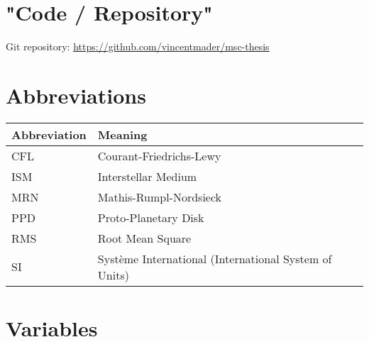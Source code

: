 \section{"Code / Repository"}

Git repository:
\url{https://github.com/vincentmader/msc-thesis} %

\section{Abbreviations}

    \begin{table}[h!]
        \begin{tabular}{|l|l|}
            \hline
            \textbf{Abbreviation}   & \textbf{Meaning} \\
            \hline
            CFL                     & Courant-Friedrichs-Lewy \\
            \hline
            ISM                     & Interstellar Medium \\
            \hline
            MRN                     & Mathis-Rumpl-Nordsieck \\
            \hline
            PPD                     & Proto-Planetary Disk \\
            \hline
            RMS                     & Root Mean Square \\
            \hline
            SI                      & Système International (International System of Units) \\
            \hline                  %
        \end{tabular}
    \end{table}

\section{Variables}


